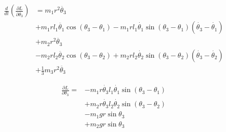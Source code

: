 \documentclass[titlepage]{article}
\numberwithin{equation}{section}
\begin{document}
\begin{align}
\frac{d}{dt} \left(\frac{\partial L}{\partial \dot{\theta_3}}\right) &= m_1 r^2 \ddot{\theta_3} \nonumber \\
 &+ m_1 r l_1 \ddot{\theta_1} \cos{(\theta_3 - \theta_1)} - m_1 r l_1 \dot{\theta_1} \sin{(\theta_3 - \theta_1)} (\dot{\theta_3} - \dot{\theta_1}) \nonumber \\
 &+ m_2 r^2 \ddot{\theta_3} \nonumber \\
 &- m_2 r l_2 \ddot{\theta_2} \cos{(\theta_3 - \theta_2)} + m_2 r l_2 \dot{\theta_2} \sin{(\theta_3 - \theta_2)} (\dot{\theta_3} - \dot{\theta_2}) \nonumber \\
 &+ \frac{1}{3} m_3 r^2 \ddot{\theta_3} \label{eq:LE_left_t3}
\end{align}

\begin{align}
\frac{\partial L}{\partial \theta_3} = &- m_1 r \dot{\theta_3} l_1 \dot{\theta_1} \sin{(\theta_3 - \theta_1)} \nonumber \\
 &+ m_2 r \dot{\theta_3} l_2 \dot{\theta_2} \sin{(\theta_3 - \theta_2)} \nonumber \\
 &- m_1 g r \sin \theta_3 \nonumber \\
 &+ m_2 g r \sin \theta_3
\label{eq:LE_right_t3}
\end{align}
\end{document}
